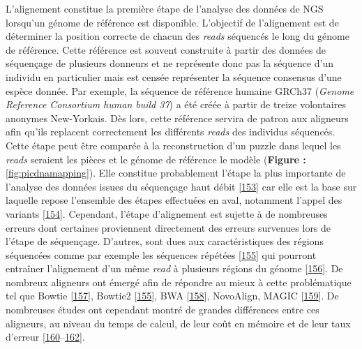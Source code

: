 \documentclass[12pt,a4paper,twoside]{ugathesis}
\theoremstyle{definition}
\theoremstyle{definition}
\theoremstyle{definition}
\theoremstyle{remark}
\begin{document}
L'alignement constitue la première étape de l'analyse des données de NGS
lorsqu'un génome de référence est disponible. L'objectif de l'alignement
est de déterminer la position correcte de chacun des \emph{reads}
séquencés le long du génome de référence. Cette référence est souvent
construite à partir des données de séquençage de plusieurs donneurs et
ne représente donc pas la séquence d'un individu en particulier mais est
censée représenter la séquence consensus d'une espèce donnée. Par
exemple, la séquence de référence humaine GRCh37 (\emph{Genome Reference
Consortium human build 37}) a été créée à partir de treize volontaires
anonymes New-Yorkais. Dès lors, cette référence servira de patron aux
aligneurs afin qu'ils replacent correctement les différents \emph{reads}
des individus séquencés. Cette étape peut être comparée à la
reconstruction d'un puzzle dans lequel les \emph{reads} seraient les
pièces et le génome de référence le modèle (\textbf{Figure :
}\ref{fig:picdnamapping}). Elle constitue probablement l'étape la plus
importante de l'analyse des données issues du séquençage haut débit
{[}\protect\hyperlink{ref-Flicek2009}{153}{]} car elle est la base sur
laquelle repose l'ensemble des étapes effectuées en aval, notamment
l'appel des variants {[}\protect\hyperlink{ref-Nielsen2011}{154}{]}.
Cependant, l'étape d'alignement est sujette à de nombreuses erreurs dont
certaines proviennent directement des erreurs survenues lors de l'étape
de séquençage. D'autres, sont dues aux caractéristiques des régions
séquencées comme par exemple les séquences répétées
{[}\protect\hyperlink{ref-Langmead2012}{155}{]} qui pourront entraîner
l'alignement d'un même \emph{read} à plusieurs régions du génome
{[}\protect\hyperlink{ref-Treangen2013}{156}{]}. De nombreux aligneurs
ont émergé afin de répondre au mieux à cette problématique tel que
Bowtie {[}\protect\hyperlink{ref-Langmead2009}{157}{]}, Bowtie2
{[}\protect\hyperlink{ref-Langmead2012}{155}{]}, BWA
{[}\protect\hyperlink{ref-Li2009b}{158}{]}, NovoAlign, MAGIC
{[}\protect\hyperlink{ref-Su2014}{159}{]}. De nombreuses études ont
cependant montré de grandes différences entre ces aligneurs, au niveau
du temps de calcul, de leur coût en mémoire et de leur taux d'erreur
{[}\protect\hyperlink{ref-Ruffalo2011}{160}--\protect\hyperlink{ref-Bao2011}{162}{]}.

\newpage
\end{document}
